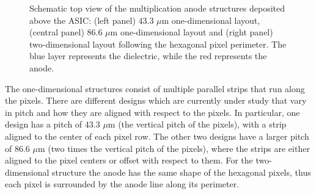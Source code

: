 \begin{figure}[!b]
\begin{subfigure}[b]{0.32\linewidth}
\label{fig:layout_2d_hex}
\end{subfigure}
\caption{Schematic top view of the multiplication anode structures deposited above the ASIC: (left panel) 43.3 $\mu$m one-dimensional layout, (central panel) 86.6 $\mu$m one-dimensional layout and (right panel) two-dimensional layout following the hexagonal pixel perimeter. The blue layer represents the dielectric, while the red represents the anode.}
\label{fig:anode_layouts}
\end{figure}

The one-dimensional structures consist of multiple parallel strips that run along the pixels. There are different designs which are currently under study that vary in pitch and how they are aligned with respect to the pixels. In particular, one design has a pitch of 43.3 $\mu\text{m}$ (the vertical pitch of the pixels), with a strip aligned to the center of each pixel row. The other two designs have a larger pitch of 86.6 $\mu\text{m}$ (two times the vertical pitch of the pixels), where the strips are either aligned to the pixel centers or offset with respect to them. For the two-dimensional structure the anode has the same shape of the hexagonal pixels, thus each pixel is surrounded by the anode line along its perimeter.

